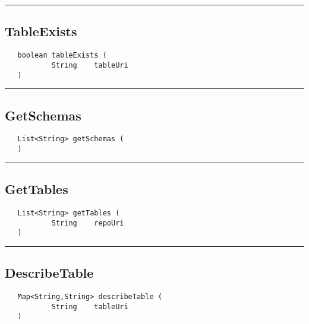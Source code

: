 \rule{15cm}{2pt}
\subsection{TableExists}
\label{Api:TableExists}
\begin{verbatim}
   boolean tableExists (
           String    tableUri
   )
\end{verbatim}



\rule{15cm}{2pt}
\subsection{GetSchemas}
\label{Api:GetSchemas}
\begin{verbatim}
   List<String> getSchemas (
   )
\end{verbatim}



\rule{15cm}{2pt}
\subsection{GetTables}
\label{Api:GetTables}
\begin{verbatim}
   List<String> getTables (
           String    repoUri
   )
\end{verbatim}



\rule{15cm}{2pt}
\subsection{DescribeTable}
\label{Api:DescribeTable}
\begin{verbatim}
   Map<String,String> describeTable (
           String    tableUri
   )
\end{verbatim}



